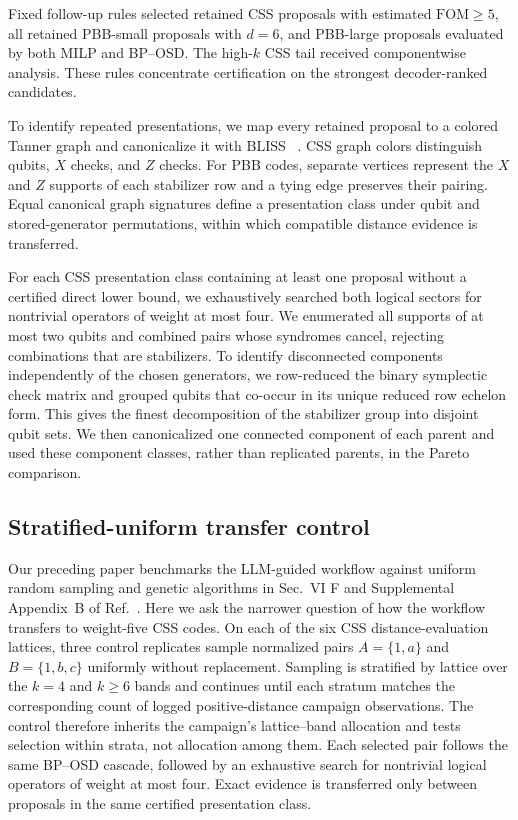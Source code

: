 \documentclass[aps,prx,twocolumn,superscriptaddress,nofootinbib,floatfix]{revtex4-2}
\newcommand{\FOM}{\ensuremath{\mathrm{FOM}}}
\begin{document}
Fixed follow-up rules selected retained CSS proposals with estimated
$\FOM\geq5$, all retained PBB-small proposals with $d=6$, and PBB-large
proposals evaluated by both MILP and BP--OSD.  The high-$k$ CSS tail received
componentwise analysis.  These rules concentrate certification on the strongest
decoder-ranked candidates.

To identify repeated presentations, we map every retained proposal to a
colored Tanner graph and canonicalize it with BLISS
~\cite{junttila2007engineering}.  CSS graph colors distinguish qubits,
$X$ checks, and $Z$ checks.  For PBB codes, separate vertices represent the
$X$ and $Z$ supports of each stabilizer row and a tying edge preserves their
pairing.  Equal canonical graph signatures define a presentation class under
qubit and stored-generator permutations, within which compatible distance
evidence is transferred.

For each CSS presentation class containing at least one proposal without a
certified direct lower bound, we
exhaustively searched both logical sectors for nontrivial operators of weight
at most four.  We enumerated all supports of at most two qubits and combined
pairs whose syndromes cancel, rejecting combinations that are stabilizers.  To
identify disconnected components independently of the chosen generators, we
row-reduced the binary symplectic
check matrix and grouped qubits that co-occur in its unique reduced row echelon
form.  This gives the finest decomposition of the stabilizer group into disjoint
qubit sets.  We then canonicalized one connected component of each parent and
used these component classes, rather than replicated parents, in the Pareto
comparison.

\subsection{Stratified-uniform transfer control}
\label{sec:uniform-control}

Our preceding paper benchmarks the LLM-guided workflow against uniform random
sampling and genetic algorithms in Sec.~VI F and Supplemental Appendix~B of
Ref.~\cite{cruzbenito2026evolutionary}.  Here we ask the narrower question of
how the workflow transfers to weight-five CSS codes.  On each of the six CSS
distance-evaluation lattices, three control replicates sample normalized pairs
$A=\{1,a\}$ and $B=\{1,b,c\}$ uniformly without replacement.  Sampling is
stratified by lattice over the $k=4$ and $k\geq6$ bands and continues until
each stratum matches the corresponding count of logged positive-distance
campaign observations.  The control therefore inherits the campaign's
lattice--band allocation and tests selection within strata, not allocation
among them.  Each selected pair follows the same BP--OSD cascade, followed by
an exhaustive search for nontrivial logical operators of weight at most four.
Exact evidence is transferred only between proposals in the same certified
presentation class.
\end{document}
